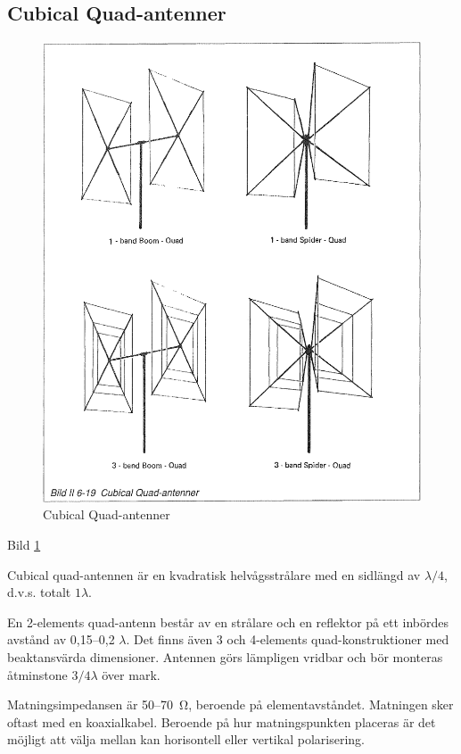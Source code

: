 \subsection{Cubical Quad-antenner}

\begin{figure}
  \includegraphics[width=\textwidth]{images/bild_2_6-19}
  \caption{Cubical Quad-antenner}
  \label{fig:bildII6-19}
\end{figure}

Bild \ref{fig:bildII6-19}

Cubical quad-antennen är en kvadratisk helvågsstrålare med en sidlängd
av \(\lambda/4\), d.v.s. totalt \(1\lambda\).

En 2-elements quad-antenn består av en strålare och en reflektor på
ett inbördes avstånd av 0,15--0,2 \(\lambda\). Det finns även 3 och
4-elements quad-konstruktioner med beaktansvärda dimensioner. Antennen
görs lämpligen vridbar och bör monteras åtminstone \(3/4 \lambda\)
över mark.

Matningsimpedansen är 50--70~Ω, beroende på elementavståndet.
Matningen sker oftast med en koaxialkabel. Beroende på hur
matningspunkten placeras är det möjligt att välja mellan kan
horisontell eller vertikal polarisering.


